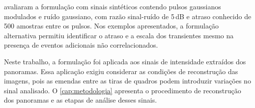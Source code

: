  avaliaram a formulação com sinais sintéticos contendo
pulsos gaussianos modulados e ruído gaussiano, com razão sinal-ruído de 5\,dB e
atraso conhecido de 500 amostras entre os pulsos. Nos exemplos apresentados,
a formulação alternativa permitiu identificar o atraso e a escala dos
transientes mesmo na presença de eventos adicionais não correlacionados.

Neste trabalho, a formulação foi aplicada aos sinais de intensidade extraídos
dos panoramas. Essa aplicação exigiu considerar as condições de reconstrução
das imagens, pois as emendas entre as tiras de quadros podem introduzir
variações no sinal analisado. O \autoref{cap:metodologia} apresenta o
procedimento de reconstrução dos panoramas e as etapas de análise desses sinais.
